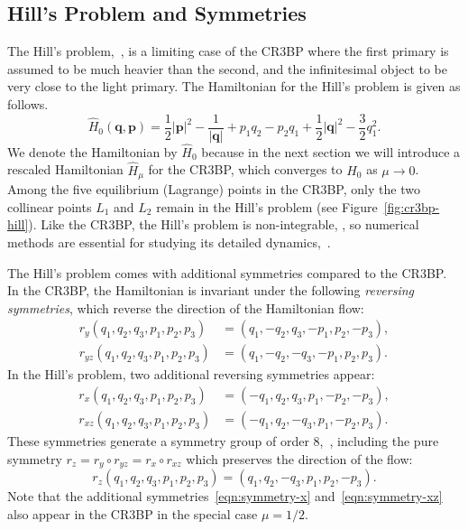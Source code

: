 \documentclass[pdflatex,sn-mathphys-ay]{sn-jnl}%
\theoremstyle{thmstyleone}%
\theoremstyle{thmstyletwo}%
\theoremstyle{thmstylethree}%
\begin{document}
\subsection{Hill's Problem and Symmetries}
\label{sec:hills_problem}
The Hill's problem,~\cite{hill_researches_1878}, is a limiting case of the CR3BP where the first primary is assumed to be much heavier than the second, and the infinitesimal object to be very close to the light primary. 
The Hamiltonian for the Hill's problem is given as follows.
\begin{equation}
    \label{eqn:hill-hamiltonian}
    \hat{H}_0(\mathbf{q}, \mathbf{p}) = \frac{1}{2}|\mathbf{p}|^2 - \frac{1}{|\mathbf{q}|} + p_1 q_2 - p_2 q_1 + \frac{1}{2}|\mathbf{q}|^2 - \frac{3}{2}q_1^2.
\end{equation}
We denote the Hamiltonian by $\hat{H}_0$ because in the next section we will introduce a rescaled Hamiltonian $\hat{H}_\mu$ for the CR3BP, which converges to $\hat{H}_0$ as $\mu\to 0$.
Among the five equilibrium (Lagrange) points in the CR3BP, only the two collinear points $L_1$ and $L_2$ remain in the Hill's problem (see Figure~\ref{fig:cr3bp-hill}).
Like the CR3BP, the Hill's problem is non-integrable, \cite{Morales-Ruiz-non-integrable}, so numerical methods are essential for studying its detailed dynamics,~\cite{simo-stuchi_centeral_2000}.

The Hill's problem comes with additional symmetries compared to the CR3BP. 
In the CR3BP, the Hamiltonian is invariant under the following \emph{reversing symmetries}, which reverse the direction of the Hamiltonian flow:
\begin{align}
r_y(q_1, q_2, q_3, p_1, p_2, p_3) &= (q_1, -q_2, q_3, -p_1, p_2, -p_3), \label{eqn:symmetry-y} \\
r_{yz}(q_1, q_2, q_3, p_1, p_2, p_3) &= (q_1, -q_2, -q_3, -p_1, p_2, p_3). \label{eqn:symmetry-yz}
\end{align}
In the Hill's problem, two additional reversing symmetries appear:
\begin{align}
r_x(q_1, q_2, q_3, p_1, p_2, p_3) &= (-q_1, q_2, q_3, p_1, -p_2, -p_3), \label{eqn:symmetry-x} \\
r_{xz}(q_1, q_2, q_3, p_1, p_2, p_3) &= (-q_1, q_2, -q_3, p_1, -p_2, p_3). \label{eqn:symmetry-xz}
\end{align}
These symmetries generate a symmetry group of order $8$,~\cite{aydin_symmetries_2023}, including the pure symmetry $r_z = r_y \circ r_{yz} = r_x \circ r_{xz}$ which preserves the direction of the flow:
\[
r_z(q_1, q_2, q_3, p_1, p_2, p_3) = (q_1, q_2, -q_3, p_1, p_2, -p_3).
\]
Note that the additional symmetries~\eqref{eqn:symmetry-x} and~\eqref{eqn:symmetry-xz} also appear in the CR3BP in the special case $\mu=1/2$.
\end{document}
